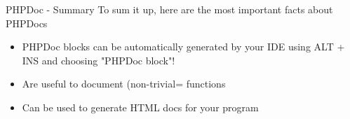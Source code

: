 \begin{frame}[fragile]{PHPDoc - Summary}	
	To sum it up, here are the most important facts about PHPDocs\pause
	\begin{itemize}
	\item PHPDoc blocks can be automatically generated by your IDE using ALT + INS and choosing "PHPDoc block"!\pause
	\item Are useful to document (non-trivial= functions \pause
	\item Can be used to generate HTML docs for your program \pause
	\end{itemize}
\end{frame}	



